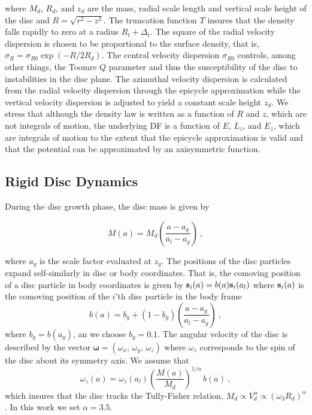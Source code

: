 \noindent where $M_d$, $R_d$, and $z_d$ are the mass, radial scale
length and vertical scale height of the disc and $R=\sqrt{r^2-z^2}$.
The truncation function $T$ insures that the density falls rapidly to
zero at a radius $R_t + \Delta_t$.  The square of the radial velocity
dispersion is chosen to be proportional to the surface density, that
is, $\sigma_R = \sigma_{R0}\exp{\left (-R/2R_d\right )}$.  The central
velocity dispersion $\sigma_{R0}$ controls, among other things, the
Toomre $Q$ parameter and thus the susceptibility of the disc to
instabilities in the disc plane.  The azimuthal velocity dispersion is
calculated from the radial velocity dispersion through the epicycle
approximation \citep[for details see][]{BT} while the vertical velocity
dispersion is adjusted to yield a constant scale height $z_d$.  We
stress that although the density law is written as a function of $R$
and $z$, which are not integrals of motion, the underlying DF is a
function of $E$, $L_z$, and $E_z$, which are integrals of motion to
the extent that the epicycle approximation is valid and that the
potential can be approximated by an axisymmetric function.

\subsection{Rigid Disc Dynamics} \label{sec:rigid_disks}

During the disc growth phase, the disc mass is given by

\begin{equation}\label{eq:mass}
M(a) = M_d \left( \frac{a - a_g}{a_l - a_g} \right)~,
\end{equation}

\noindent where $a_g$ is the scale factor evaluated at $z_g$. The
positions of the disc particles expand self-similarly in disc or body
coordinates.  That is, the comoving position of a disc particle in
body coordinates is given by ${\bf s}_i(a) = b(a){\bf s}_i
(a_l )$ where ${\bf s}_i(a)$ is the comoving position
of the $i$'th disc particle in the body frame
\begin{equation}\label{eq:scale}
b(a) = b_g + \left (1 - b_g\right ) \left( \frac{a - a_g}{a_l - a_g} \right)~,
\end{equation}
where $b_g = b(a_g)$, an we choose $b_g = 0.1$. The angular velocity of the disc is described by the vector
$\boldsymbol{\omega} = \left (\omega_x,\, \omega_y,\,\omega_z\right )$
where $\omega_z$ corresponds to the spin of the disc about its
symmetry axis.  We assume that
\begin{equation}\label{eq:omega3}
\omega_z(a) = \omega_z(a_l)\left (\frac{M(a)}{M_d}\right )^{1/\alpha}\,b(a)~,
\end{equation}
\noindent which insures that the disc tracks the Tully-Fisher
relation, $M_d\propto V_d^\alpha\propto \left (\omega_3R_d\right
)^\alpha$ \citep{TullyFisherModern}.  In this work we set
$\alpha=3.5$.

